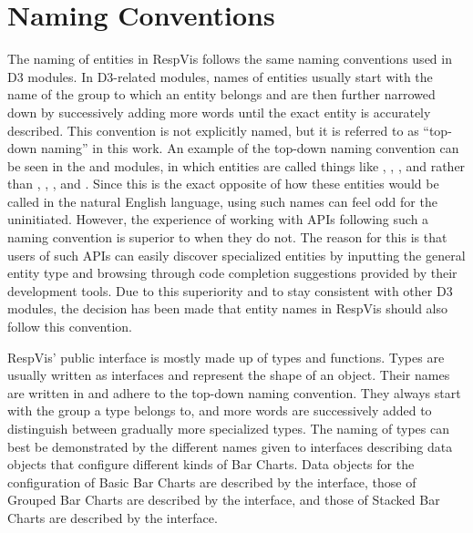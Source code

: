 


\section{Naming Conventions}
\label{sec:NamingConventions}

The naming of entities in RespVis follows the same naming conventions
used in D3 modules.  In D3-related modules, names of entities usually
start with the name of the group to which an entity belongs and are
then further narrowed down by successively adding more words until the
exact entity is accurately described.  This convention is not
explicitly named, but it is referred to as \enquote{top-down naming}
in this work.  An example of the top-down naming convention can be
seen in the  \parencite{D3Scale} and 
\parencite{D3Axis} modules, in which entities are called things like
, , , and
 rather than , ,
, and .  Since this is the exact
opposite of how these entities would be called in the natural English
language, using such names can feel odd for the uninitiated.  However,
the experience of working with APIs following such a naming convention
is superior to when they do not.  The reason for this is that users of
such APIs can easily discover specialized entities by inputting the
general entity type and browsing through code completion suggestions
provided by their development tools.  Due to this superiority and to
stay consistent with other D3 modules, the decision has been made that
entity names in RespVis should also follow this convention.

RespVis' public interface is mostly made up of types and functions.
Types are usually written as interfaces and represent the shape of an
object.  Their names are written in  and adhere to
the top-down naming convention.  They always start with the group a
type belongs to, and more words are successively added to distinguish
between gradually more specialized types.  The naming of types can
best be demonstrated by the different names given to interfaces
describing data objects that configure different kinds of Bar Charts.
Data objects for the configuration of Basic Bar Charts are described
by the  interface, those of Grouped Bar Charts are
described by the  interface, and those of
Stacked Bar Charts are described by the 
interface.

